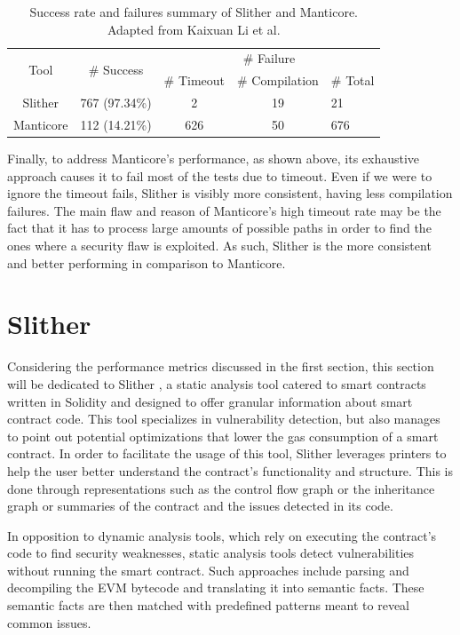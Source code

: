 \begin{table}
\centering
\begin{tabular}{ccccl}
\hline
\multirow{2}{*}{Tool} & \multirow{2}{*}{\# Success} & \multicolumn{3}{c}{\# Failure}         \\ \cline{3-5} 
                      &                             & \# Timeout & \# Compilation & \# Total \\ \hline
Slither               & 767 (97.34\%)               & 2          & 19             & 21       \\
Manticore             & 112 (14.21\%)               & 626        & 50             & 676      \\ \hline
\end{tabular}
\caption{Success rate and failures summary of Slither and Manticore. Adapted from Kaixuan Li et al. \cite{staticAnalysisToolsComparison}}
\label{tab:my-table2}
\end{table}

Finally, to address Manticore's performance, as shown above, its exhaustive approach causes it to fail most of the tests due to timeout. Even if we were to ignore the timeout fails, Slither is visibly more consistent, having less compilation failures. The main flaw and reason of Manticore's high timeout rate may be the fact that it has to process large amounts of possible paths in order to find the ones where a security flaw is exploited. As such, Slither is the more consistent and better performing in comparison to Manticore.

\section{Slither}

Considering the performance metrics discussed in the first section, this section will be dedicated to Slither \cite{slither}, a static analysis tool catered to smart contracts written in Solidity and designed to offer granular information about smart contract code. This tool specializes in vulnerability detection, but also manages to point out potential optimizations that lower the gas consumption of a smart contract. In order to facilitate the usage of this tool, Slither leverages printers to help the user better understand the contract’s functionality and structure. This is done through representations such as the control flow graph or the inheritance graph or summaries of the contract and the issues detected in its code. 

In opposition to dynamic analysis \cite{dynamicAnalysis} tools, which rely on executing the contract’s code to find security weaknesses, static analysis tools detect vulnerabilities without running the smart contract. Such approaches include parsing and decompiling the EVM bytecode and translating it into semantic facts. These semantic facts are then matched with predefined patterns meant to reveal common issues.

